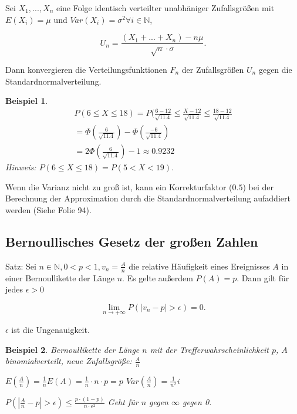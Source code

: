 \documentclass{tufte-handout}
\theoremstyle{own}
\newtheorem{example}{Beispiel}[]
\begin{document}
Sei $X_1,...,X_n$ eine Folge identisch verteilter unabhäniger Zufallsgrößen
mit $E(X_i) = \mu$ und $Var(X_i) = \sigma^2 \forall i \in \mathbb{N}$,

\begin{equation}
	U_n = \frac{(X_1 + ... + X_n) - n\mu}{\sqrt{n} \cdot \sigma}.
\end{equation}

Dann konvergieren die Verteilungsfunktionen $F_n$ der Zufallsgrößen $U_n$ gegen
die Standardnormalverteilung.

\begin{example}
	\begin{gather*}
		P(6 \le X \le 18) = P(\frac{6-12}{\sqrt{11.4}} \le \frac{X-12}{\sqrt{11.4}} 
		\le \frac{18-12}{\sqrt{11.4}}\\
		= \Phi (\frac{6}{\sqrt{11.4}}) - \Phi (\frac{-6}{\sqrt{11.4}}) \\
		= 2 \Phi (\frac{6}{\sqrt{11.4}}) - 1 \approx 0.9232
	\end{gather*}
	Hinweis: $P(6 \le X \le 18) = P(5 < X <19)$.
\end{example}

Wenn die Varianz nicht zu groß ist, kann ein Korrekturfaktor ($0.5$) bei der
Berechnung der Approximation durch die Standardnormalverteilung aufaddiert
werden (Siehe Folie 94).

\subsection{Bernoullisches Gesetz der großen Zahlen}

Satz: Sei $n \in \mathbb{N}, 0 < p < 1, v_n = \frac{A}{n}$ die relative 
Häufigkeit eines Ereignisses $A$ in einer Bernoullikette der Länge $n$. Es 
gelte außerdem $P(A) = p$. Dann gilt für jedes $\epsilon > 0$

\begin{equation}
	\lim_{n \rightarrow +\infty} P(|v_n - p| > \epsilon) = 0.
\end{equation}

$\epsilon$ ist die Ungenauigkeit.

\begin{example}
Bernoullikette der Länge $n$ mit der Trefferwahrscheinlichkeit $p$, $A$
binomialverteilt, neue Zufallsgröße: $\frac{A}{n}$

$E(\frac{A}{n}) = \frac{1}{n} E(A) = \frac{1}{n} \cdot n \cdot p = p$
$Var(\frac{A}{n}) = \frac{1}{n^2}$i

$P(|\frac{A}{n} - p| > \epsilon) \le \frac{p \cdot (1 - p)}{n \cdot \epsilon^2}$
Geht für $n$ gegen $\infty$ gegen 0.
\end{example}
\end{document}
